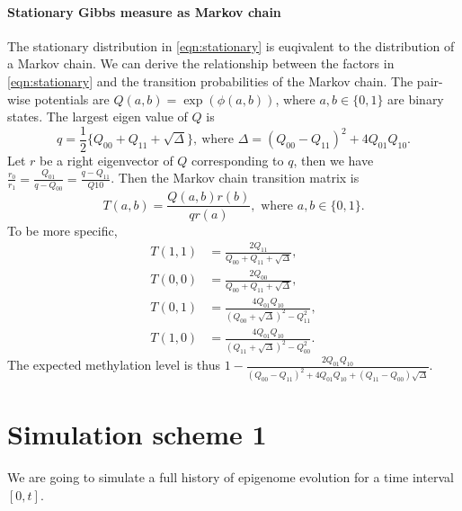 \documentclass[11pt]{article}
\begin{document}
\paragraph{Stationary Gibbs measure as Markov chain}
The stationary distribution in \ref{eqn:stationary} is euqivalent to
the distribution of a Markov chain. We can derive the relationship
between the factors in  \ref{eqn:stationary} and the transition
probabilities of the Markov chain. The pair-wise potentials are
$Q(a,b)=\exp(\phi(a, b))$, where $a, b\in\{0,1\}$ are binary
states. The largest eigen value of $Q$ is
\[
q=\frac{1}{2}\{Q_{00}+Q_{11} +\sqrt{\Delta}\}, ~\text{where } \Delta=(Q_{00}-Q_{11})^2
+ 4Q_{01}Q_{10}.
\]
Let $r$ be a right eigenvector of $Q$ corresponding to $q$, then we have
$\frac{r_0}{r_1}=\frac{Q_{01}}{q-Q_{00}} = \frac{q-Q_{11}}{Q10}$.
Then the Markov chain transition matrix is
\[
  T(a,b) = \frac{Q(a,b)r(b)}{qr(a)}, \text{ where } a,b\in \{0,1\}.
\]
To be more specific,
\begin{equation}
  \begin{aligned}
    T(1,1) &= \frac{2Q_{11}}{Q_{00}+Q_{11}+\sqrt{\Delta}}, \\
    T(0,0) &= \frac{2Q_{00}}{Q_{00}+Q_{11}+\sqrt{\Delta}}, \\
    T(0,1) &= \frac{4Q_{01}Q_{10}}{(Q_{00}+\sqrt{\Delta})^2 -Q_{11}^2}, \\
    T(1,0) &= \frac{4Q_{01}Q_{10}}{(Q_{11}+\sqrt{\Delta})^2 -Q_{00}^2}.
  \end{aligned}
\end{equation}
The expected methylation level is thus $1-
\frac{2Q_{01}Q_{10}}{(Q_{00}-Q_{11})^2 + 4Q_{01}Q_{10} +
(Q_{11}-Q_{00})\sqrt{\Delta}}.$


\section{Simulation scheme 1}
We are going to simulate a full history of epigenome evolution for a
time interval $[0, t]$.
\end{document}
